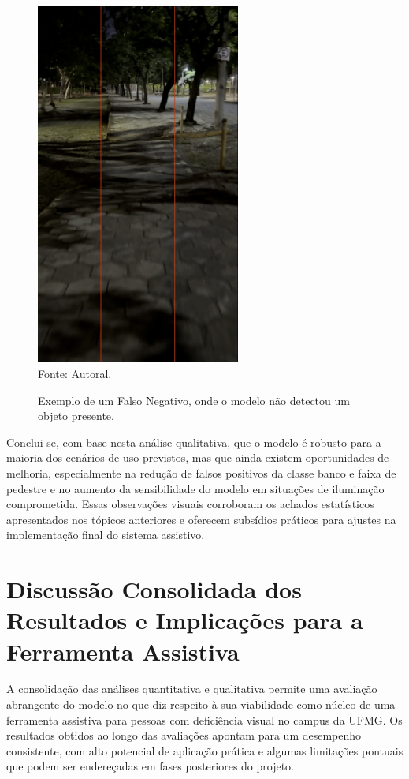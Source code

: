 \begin{figure}[htbp]
  \centering
  \caption{Exemplo de um Falso Negativo, onde o modelo não detectou um objeto presente.}
  \includegraphics[width=0.6\textwidth]{Figuras/falso_negativo.png}
  \\
  Fonte: Autoral.
  \label{fg-falso_negativo}
\end{figure}

Conclui-se, com base nesta análise qualitativa, que o modelo é robusto para a maioria dos cenários de uso previstos, mas que ainda existem oportunidades de melhoria, especialmente na redução de falsos positivos da classe banco e faixa de pedestre e no aumento da sensibilidade do modelo em situações de iluminação comprometida. Essas observações visuais corroboram os achados estatísticos apresentados nos tópicos anteriores e oferecem subsídios práticos para ajustes na implementação final do sistema assistivo.

\section{\textbf{Discussão Consolidada dos Resultados e Implicações para a Ferramenta Assistiva}}

A consolidação das análises quantitativa e qualitativa permite uma avaliação abrangente do modelo no que diz respeito à sua viabilidade como núcleo de uma ferramenta assistiva para pessoas com deficiência visual no campus da UFMG. Os resultados obtidos ao longo das avaliações apontam para um desempenho consistente, com alto potencial de aplicação prática e algumas limitações pontuais que podem ser endereçadas em fases posteriores do projeto.

